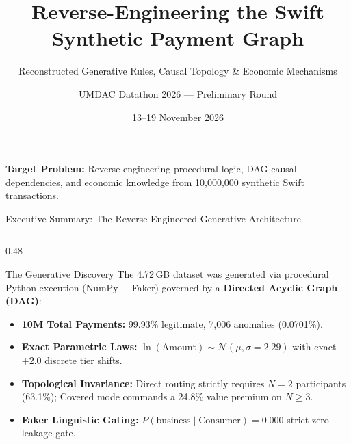 \documentclass[aspectratio=169, 10pt]{beamer}
\title[UMDAC Datathon 2026 --- Swift Payments]{Reverse-Engineering the Swift Synthetic Payment Graph}
\subtitle{Reconstructed Generative Rules, Causal Topology \& Economic Mechanisms}
\author[Team Analytical Blueprint]{UMDAC Datathon 2026 --- Preliminary Round}
\institute[Universiti Malaya / Swift]{Faculty of Computer Science \& Information Technology, Universiti Malaya}
\date{13--19 November 2026}
\begin{document}
\begin{frame}
  \titlepage
  \begin{center}
    \footnotesize
    \textbf{Target Problem:} Reverse-engineering procedural logic, DAG causal dependencies, and economic knowledge from 10,000,000 synthetic Swift transactions.
  \end{center}
\end{frame}

\begin{frame}{Executive Summary: The Reverse-Engineered Generative Architecture}
\begin{columns}[T]
  \begin{column}{0.48\textwidth}
    \begin{block}{The Generative Discovery}
      \footnotesize
      The 4.72\,GB dataset was generated via procedural Python execution (NumPy + Faker) governed by a \textbf{Directed Acyclic Graph (DAG)}:
      \begin{itemize}
        \item \textbf{10M Total Payments:} 99.93\% legitimate, 7,006 anomalies (0.0701\%).
        \item \textbf{Exact Parametric Laws:} $\ln(\text{Amount}) \sim \mathcal{N}(\mu, \sigma=2.29)$ with exact $+2.0$ discrete tier shifts.
        \item \textbf{Topological Invariance:} Direct routing strictly requires $N=2$ participants (63.1\%); Covered mode commands a 24.8\% value premium on $N \ge 3$.
        \item \textbf{Faker Linguistic Gating:} $P(\text{business} \mid \text{Consumer}) = 0.000$ strict zero-leakage gate.
      \end{itemize}
    \end{block}
  \end{column}
  

\end{columns}
\end{frame}
\end{document}
